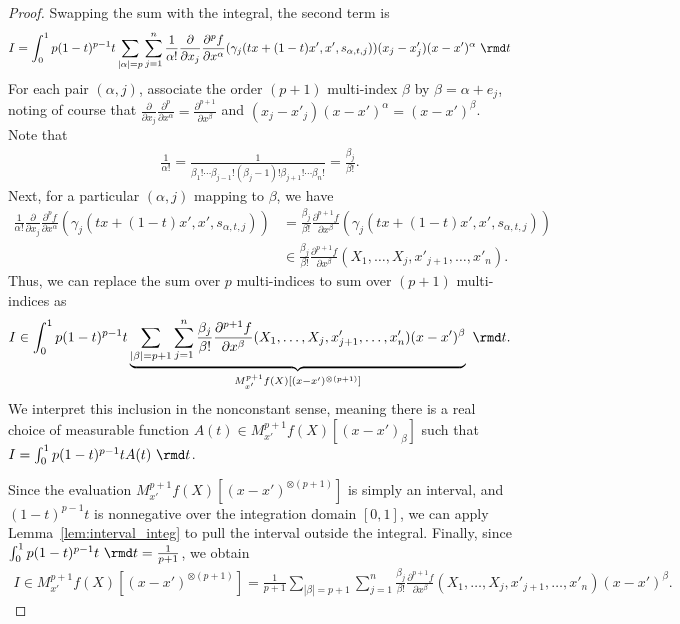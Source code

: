 \documentclass{article}
\theoremstyle{plain}
\theoremstyle{remark}
\begin{document}
\begin{proof}
Swapping the sum with the integral, the second term is
\begin{align*}
    I = \int_0^1 p (1 - t)^{p-1} t \sum_{|\alpha| = p} \sum_{j=1}^n \frac{1}{\alpha!}  \frac{\partial}{\partial x_j} \frac{\partial^pf}{\partial x^\alpha} (\gamma_j(tx + (1-t)x', x', s_{\alpha,t,j})) (x_j - x'_j)(x - x')^{\alpha}  \ \rmd t
\end{align*}
For each pair $(\alpha,j)$, associate the order $(p+1)$ multi-index $\beta$ by $\beta = \alpha + e_j$, noting of course that $\frac{\partial}{\partial x_j} \frac{\partial^p}{\partial x^\alpha} = \frac{\partial^{p+1}}{\partial x^\beta}$ and $(x_j - x'_j)(x - x')^{\alpha} = (x - x')^\beta$. Note that
\begin{align*}
    \frac{1}{\alpha!} = \frac{1}{\beta_1!\cdots\beta_{j-1}!(\beta_j-1)!\beta_{j+1}!\cdots\beta_n!} = \frac{\beta_j}{\beta!}.
\end{align*}
Next, for a particular $(\alpha,j)$ mapping to $\beta$, we have
\begin{align*}
    \frac{1}{\alpha!}  \frac{\partial}{\partial x_j} \frac{\partial^pf}{\partial x^\alpha} (\gamma_j(tx + (1-t)x', x', s_{\alpha,t,j}))  
    &= \frac{\beta_j}{\beta!} \frac{\partial^{p+1}f}{\partial x^\beta} (\gamma_j(tx + (1-t)x', x', s_{\alpha,t,j})) 
    \\
    &\in \frac{\beta_j}{\beta!} \frac{\partial^{p+1} f}{\partial x^\beta} (X_1,\dots,X_j,x'_{j+1},\dots,x'_n).
\end{align*}
Thus, we can replace the sum over $p$ multi-indices to sum over $(p+1)$ multi-indices as
\begin{align*}
    I \in \int_0^1 p (1 - t)^{p-1} t \underbrace{\sum_{|\beta| = p+1} \sum_{j=1}^n \frac{\beta_j}{\beta!} \frac{\partial^{p+1} f}{\partial x^\beta} (X_1,\dots,X_j,x'_{j+1},\dots,x'_n)(x - x')^\beta}_{M^{p+1}_{x'}f(X)[(x - x')^{\otimes (p+1)}]}   \ \rmd t.
\end{align*}
We interpret this inclusion in the nonconstant sense, meaning there is a real choice of measurable function $A(t)\in M^{p+1}_{x'}f(X)[(x - x')_\beta]$ such that $I = \int_0^1 p (1 - t)^{p-1} t A(t) \ \rmd t$.

Since the evaluation $M^{p+1}_{x'}f(X)[(x - x')^{\otimes (p+1)}]$ is simply an interval, and $(1 - t)^{p-1} t$ is nonnegative over the integration domain $[0,1]$, 
we can apply Lemma~\ref{lem:interval_integ} to pull the interval outside the integral.
Finally, since $\int_0^1 p(1-t)^{p-1} t \ \rmd t = \frac{1}{p+1}$, we obtain
\begin{align*}
    I\in M_{x'}^{p+1}f(X)[(x - x')^{\otimes (p+1)}] = \frac{1}{p+1}  \sum_{|\beta| = p+1} \sum_{j=1}^n \frac{\beta_j}{\beta!} \frac{\partial^{p+1} f}{\partial x^\beta} (X_1,\dots,X_j,x'_{j+1},\dots,x'_n) (x - x')^\beta.
\end{align*}


\end{proof}
\end{document}
